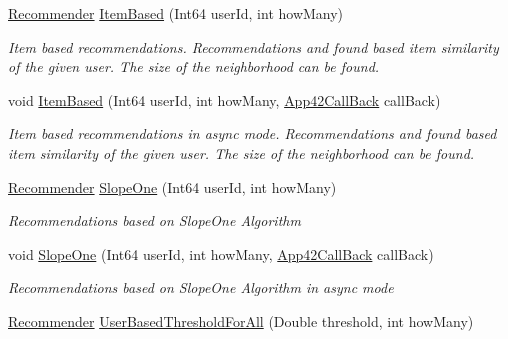\begin{DoxyCompactItemize}
\hyperlink{classcom_1_1shephertz_1_1app42_1_1paas_1_1sdk_1_1csharp_1_1recommend_1_1_recommender}{Recommender} \hyperlink{classcom_1_1shephertz_1_1app42_1_1paas_1_1sdk_1_1csharp_1_1recommend_1_1_recommender_service_a9d834f44d8f1c5f7c61f57be7029d744}{Item\+Based} (Int64 user\+Id, int how\+Many)
\begin{DoxyCompactList}\small\item\em Item based recommendations. Recommendations and found based item similarity of the given user. The size of the neighborhood can be found. \end{DoxyCompactList}\item 
void \hyperlink{classcom_1_1shephertz_1_1app42_1_1paas_1_1sdk_1_1csharp_1_1recommend_1_1_recommender_service_a7cfb2ed11b0d3161f30c36f9bb56da34}{Item\+Based} (Int64 user\+Id, int how\+Many, \hyperlink{interfacecom_1_1shephertz_1_1app42_1_1paas_1_1sdk_1_1csharp_1_1_app42_call_back}{App42\+Call\+Back} call\+Back)
\begin{DoxyCompactList}\small\item\em Item based recommendations in async mode. Recommendations and found based item similarity of the given user. The size of the neighborhood can be found. \end{DoxyCompactList}\item 
\hyperlink{classcom_1_1shephertz_1_1app42_1_1paas_1_1sdk_1_1csharp_1_1recommend_1_1_recommender}{Recommender} \hyperlink{classcom_1_1shephertz_1_1app42_1_1paas_1_1sdk_1_1csharp_1_1recommend_1_1_recommender_service_a947e83b0770dfa2412bf469ec1a1f972}{Slope\+One} (Int64 user\+Id, int how\+Many)
\begin{DoxyCompactList}\small\item\em Recommendations based on Slope\+One Algorithm \end{DoxyCompactList}\item 
void \hyperlink{classcom_1_1shephertz_1_1app42_1_1paas_1_1sdk_1_1csharp_1_1recommend_1_1_recommender_service_a8ba78258d149a048b227af14bc625b0a}{Slope\+One} (Int64 user\+Id, int how\+Many, \hyperlink{interfacecom_1_1shephertz_1_1app42_1_1paas_1_1sdk_1_1csharp_1_1_app42_call_back}{App42\+Call\+Back} call\+Back)
\begin{DoxyCompactList}\small\item\em Recommendations based on Slope\+One Algorithm in async mode \end{DoxyCompactList}\item 
\hyperlink{classcom_1_1shephertz_1_1app42_1_1paas_1_1sdk_1_1csharp_1_1recommend_1_1_recommender}{Recommender} \hyperlink{classcom_1_1shephertz_1_1app42_1_1paas_1_1sdk_1_1csharp_1_1recommend_1_1_recommender_service_afad344582b10048c307945ae0c817db5}{User\+Based\+Threshold\+For\+All} (Double threshold, int how\+Many)

\end{DoxyCompactItemize}
